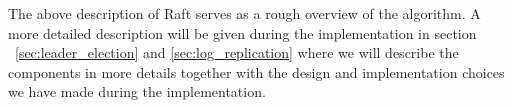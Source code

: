 The above description of Raft serves as a rough overview of the algorithm. A more detailed description will be given during the implementation in section ~\ref{sec:leader_election} and \ref{sec:log_replication} where we will describe the components in more details together with the design and implementation choices we have made during the implementation.
